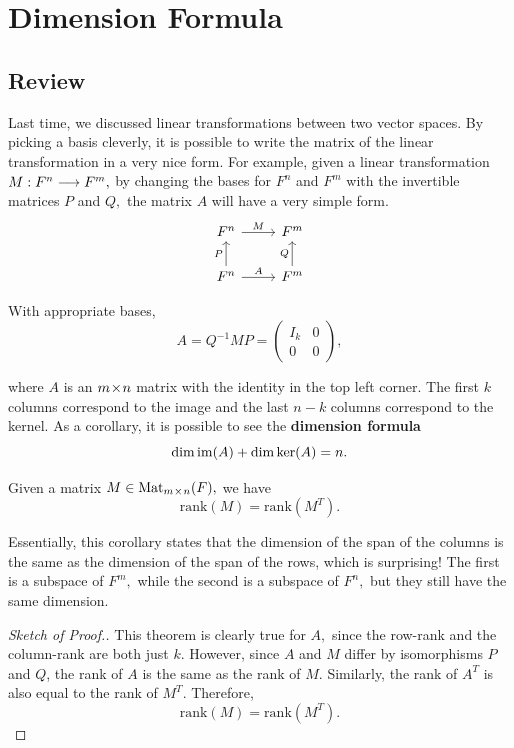 
\section{Dimension Formula}
\subsection{Review}

Last time, we discussed linear transformations between two vector spaces. By picking a basis cleverly, it is possible to write the matrix of the linear transformation in a very nice form. For example, given a linear transformation $M: F^n \longrightarrow F^m,$ by changing the bases for $F^n$ and $F^m$ with the invertible matrices $P$ and $Q,$ the matrix $A$ will have a very simple form. 
\[
\begin{tikzcd}
F^n \arrow[r, "M"] & F^m \\
F^n \arrow[u, "P"]\arrow[r, "A"] & F^m \arrow[u, "Q"]
\end{tikzcd}
\]

With appropriate bases, 
\[
A = Q^{-1} M P = \begin{pmatrix} I_k & 0 \\ 0 & 0 \end{pmatrix},
\]

where $A$ is an $m \hspace{0.05em}{\times}\hspace{0.05em} n$ matrix with the identity in the top left corner. The first $k$ columns correspond to the image and the last $n - k$ columns correspond to the kernel. As a corollary, it is possible to see the \textbf{dimension formula} \[\dim \operatorname{im} (A) + \dim \ker(A) = n.\]

\begin{corollary}
Given a matrix $M \in \text{Mat}_{m \hspace{0.05em}{\times}\hspace{0.05em} n} (F),$ we have \[\text{rank}(M) = \text{rank}(M^T).\]
\end{corollary}

Essentially, this corollary states that the dimension of the span of the columns is the same as the dimension of the span of the rows, which is surprising! The first is a subspace of $F^m,$ while the second is a subspace of $F^n,$ but they still have the same dimension.
\begin{proof}[Sketch of Proof.]
This theorem is clearly true for $A,$ since the row-rank and the column-rank are both just $k$. However, since $A$ and $M$ differ by isomorphisms $P$ and $Q$, the rank of $A$ is the same as the rank of $M.$ Similarly, the rank of $A^T$ is also equal to the rank of $M^T.$ Therefore, \[\text{rank}(M) = \text{rank}(M^T).\]
\end{proof}

